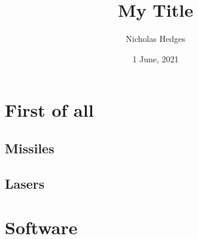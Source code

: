 \documentclass{apa-article}
\title{My Title}
\author{Nicholas Hedges}
\date{1 June, 2021}
\begin{document}
\maketitle

\section{First of all}
\lipsum
\subsection{Missiles}
\subsection{Lasers}
\section{Software}
\end{document}
